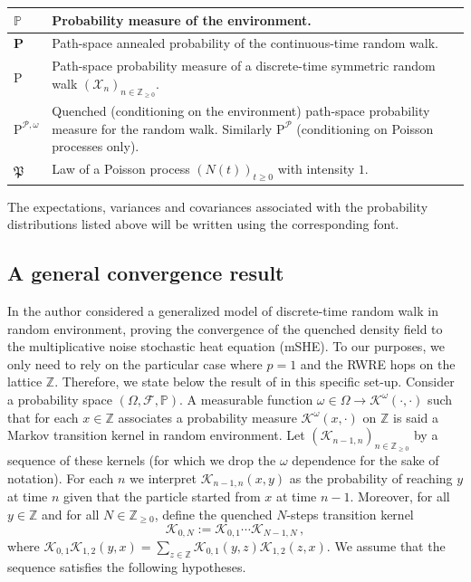 \documentclass[a4paper,11pt,oneside,reqno]{amsart}
\theoremstyle{definition}
\renewcommand{\geq}{\geqslant}
\numberwithin{equation}{section}
\begin{document}
 \medskip 
 \noindent
\begin{tabular}{|m{}|m{}|}
	\hline 
 $\mathbb{P}$ &  Probability measure of the environment.\\ \hline 
$\mathbf{P}$ & Path-space annealed probability of the continuous-time random walk. \\ \hline 
$\mathrm{P}$ & Path-space probability measure of a discrete-time symmetric random walk  $(\mathcal{X}_{n})_{n\in \mathbb{Z}_{\geq 0}}$.\\ \hline 
 $\mathrm{P}^{\mathcal{P},\omega}$& Quenched (conditioning on the environment) path-space probability measure for the random walk. Similarly $\mathrm{P}^{\mathcal{P}}$ (conditioning on Poisson processes only).\\ \hline 
 $\mathfrak{P}$  & Law of a  Poisson process  $(N(t))_{t\geq 0}$ with intensity $1$.\\ \hline 
\end{tabular}
\medskip 

The expectations, variances and covariances associated with the probability distributions listed above will be written using the corresponding font. 
 
 
 \subsection{A general convergence result}\label{section-generalConvergence}
 In \cite{parekh2} the author considered a generalized model of discrete-time random walk in random environment, proving the convergence of the quenched density field to the multiplicative noise stochastic heat equation (mSHE). To our purposes, we only need to rely on the particular case where $p=1$ and the RWRE hops on  the lattice $\mathbb{Z}$. Therefore, we state below the result of \cite{parekh2} in this specific set-up. 
 Consider a probability space $(\Omega,\mathcal{F},\mathbb{P})$. A measurable function $\omega \in \Omega\to \mathcal{K}^{\omega}(\cdot,\cdot)$ such that for each $x\in \mathbb{Z}$ associates a probability measure  $\mathcal{K}^{\omega}(x,\cdot)$ on $\mathbb{Z}$ is said a Markov transition kernel in random environment.  
 Let $\left(\mathcal{K}_{n-1,n}\right)_{n\in \mathbb{Z}_{\geq 0}}$ by a sequence of these kernels (for which we drop the $\omega$ dependence for the sake of notation). For each $n$ we interpret $\mathcal{K}_{n-1,n}(x,y)$ as {\color{black}the} probability of reaching $y$ at time $n$ given that the particle started from $x$ at time $n-1$. 
 Moreover, for all $y\in \mathbb{Z}$ and for all $N\in \mathbb{Z}_{\geq 0}$, define the quenched $N$-steps transition kernel 
 \begin{equation*}
 	\mathcal K_{0,N}:=\mathcal{K}_{0,1}\cdots \mathcal{K}_{N-1,N}\,,
 \end{equation*}
 where $\mathcal{K}_{0,1}\mathcal{K}_{1,2}(y,x)=\sum_{z\in \mathbb{Z}}\mathcal{K}_{0,1}(y,z)\mathcal{K}_{1,2}(z,x)$. We assume that the sequence satisfies the following hypotheses.
 
\end{document}

